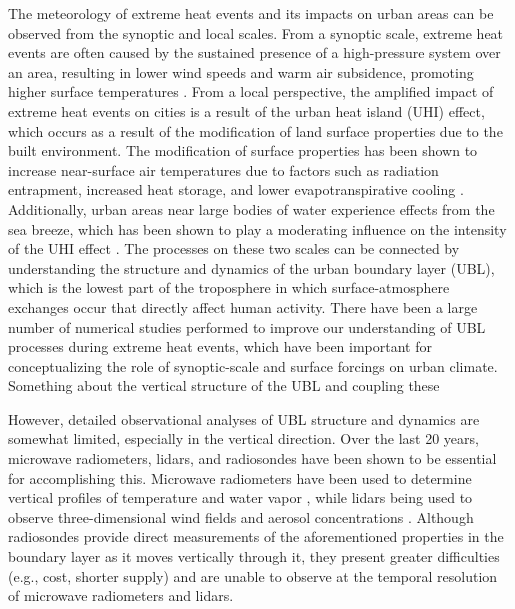 \documentclass[num-refs]{wiley-article}
\begin{document}
The meteorology of extreme heat events and its impacts on urban areas can be observed from the synoptic and local scales. From a synoptic scale, extreme heat events are often caused by the sustained presence of a high-pressure system over an area, resulting in lower wind speeds and warm air subsidence, promoting higher surface temperatures \citep{black2004, miralles2014}. From a local perspective, the amplified impact of extreme heat events on cities is a result of the urban heat island (UHI) effect, which occurs as a result of the modification of land surface properties due to the built environment. The modification of surface properties has been shown to increase near-surface air temperatures due to factors such as radiation entrapment, increased heat storage, and lower evapotranspirative cooling \citep{chen2014, li2013, ramamurthy2017a, zhao2018}. Additionally, urban areas near large bodies of water experience effects from the sea breeze, which has been shown to play a moderating influence on the intensity of the UHI effect \citep{hu2016, jiang2019, stefanon2014}. The processes on these two scales can be connected by understanding the structure and dynamics of the urban boundary layer (UBL), which is the lowest part of the troposphere in which surface-atmosphere exchanges occur that directly affect human activity. There have been a large number of numerical studies performed to improve our understanding of UBL processes during extreme heat events, which have been important for conceptualizing the role of synoptic-scale and surface forcings on urban climate. Something about the vertical structure of the UBL and coupling these

However, detailed observational analyses of UBL structure and dynamics are somewhat limited, especially in the vertical direction. Over the last 20 years, microwave radiometers, lidars, and radiosondes have been shown to be essential for accomplishing this. Microwave radiometers have been used to determine vertical profiles of temperature and water vapor \citep{rose2005, wang2012}, while lidars being used to observe three-dimensional wind fields and aerosol concentrations \citep{grund2001}. Although radiosondes provide direct measurements of the aforementioned properties in the boundary layer as it moves vertically through it, they present greater difficulties (e.g., cost, shorter supply) and are unable to observe at the temporal resolution of microwave radiometers and lidars. 
\end{document}
